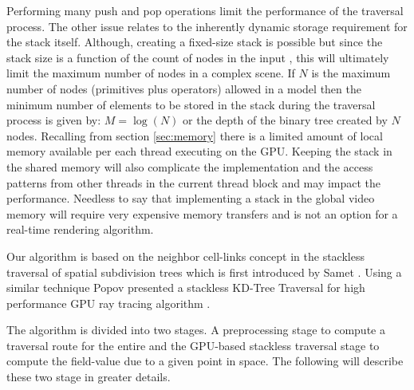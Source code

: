 Performing many push and pop operations limit the performance of the traversal process. The other issue relates to the 
inherently dynamic storage requirement for the stack itself. Although, creating a fixed-size stack is possible but since the stack size is a function of
the count of nodes in the input \blob, this will ultimately limit the maximum number of nodes in a complex scene. If $N$ is the maximum number of nodes 
(primitives plus operators) allowed in a \blob model then the minimum number of elements to be stored in the stack during the traversal process 
is given by: $M=\log(N)$ or the depth of the binary tree created by $N$ nodes. Recalling from section \ref{sec:memory} there is a limited amount of
local memory available per each thread executing on the GPU. Keeping the stack in the shared memory will also complicate the implementation and
the access patterns from other threads in the current thread block and may impact the performance. Needless to say that implementing a stack in the global 
video memory will require very expensive memory transfers and is not an option for a real-time rendering algorithm. 


Our algorithm is based on the neighbor cell-links concept in the stackless traversal of spatial subdivision trees 
which is first introduced by Samet \etal \cite{Samet1984,Samet1990}. Using a similar technique Popov \etal presented 
a stackless KD-Tree Traversal for high performance GPU ray tracing algorithm \cite{Popov2007}. 

The algorithm is divided into two stages. A preprocessing stage to compute a traversal route for the entire 
\blob and the GPU-based stackless traversal stage to compute the field-value due to a given point in space. 
The following will describe these two stage in greater details.


